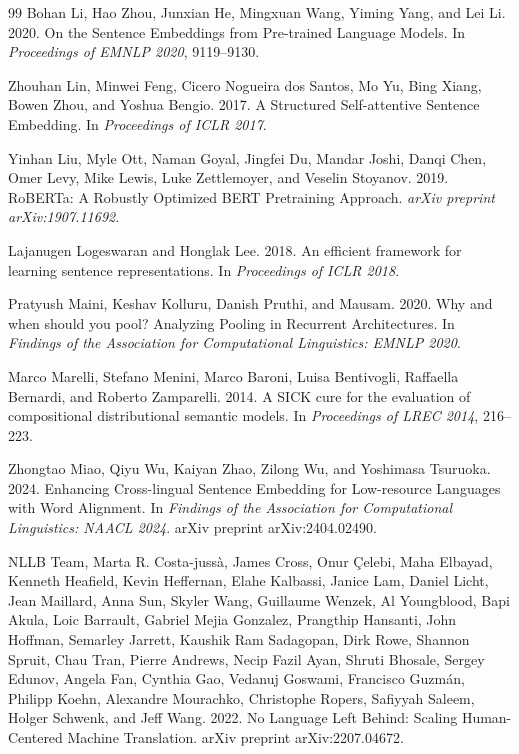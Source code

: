 \documentclass[manuscript]{acmart}
\begin{document}
\begin{thebibliography}{99}
Bohan Li, Hao Zhou, Junxian He, Mingxuan Wang, Yiming Yang, and Lei Li. 2020.
\newblock On the Sentence Embeddings from Pre-trained Language Models.
\newblock In \emph{Proceedings of EMNLP 2020}, 9119--9130.

Zhouhan Lin, Minwei Feng, Cicero Nogueira dos Santos, Mo Yu, Bing Xiang, Bowen Zhou, and Yoshua Bengio. 2017.
\newblock A Structured Self-attentive Sentence Embedding.
\newblock In \emph{Proceedings of ICLR 2017}.

Yinhan Liu, Myle Ott, Naman Goyal, Jingfei Du, Mandar Joshi, Danqi Chen, Omer Levy, Mike Lewis, Luke Zettlemoyer, and Veselin Stoyanov. 2019.
\newblock RoBERTa: A Robustly Optimized BERT Pretraining Approach.
\newblock \emph{arXiv preprint arXiv:1907.11692}.

Lajanugen Logeswaran and Honglak Lee. 2018.
\newblock An efficient framework for learning sentence representations.
\newblock In \emph{Proceedings of ICLR 2018}.

Pratyush Maini, Keshav Kolluru, Danish Pruthi, and Mausam. 2020.
\newblock Why and when should you pool? Analyzing Pooling in Recurrent Architectures.
\newblock In \emph{Findings of the Association for Computational Linguistics: EMNLP 2020}.

Marco Marelli, Stefano Menini, Marco Baroni, Luisa Bentivogli, Raffaella Bernardi, and Roberto Zamparelli. 2014.
\newblock A SICK cure for the evaluation of compositional distributional semantic models.
\newblock In \emph{Proceedings of LREC 2014}, 216--223.

Zhongtao Miao, Qiyu Wu, Kaiyan Zhao, Zilong Wu, and Yoshimasa Tsuruoka. 2024.
\newblock Enhancing Cross-lingual Sentence Embedding for Low-resource Languages with Word Alignment.
\newblock In \emph{Findings of the Association for Computational Linguistics: NAACL 2024}. arXiv preprint arXiv:2404.02490.

NLLB Team, Marta R. Costa-jussà, James Cross, Onur Çelebi, Maha Elbayad, Kenneth Heafield, Kevin Heffernan, Elahe Kalbassi, Janice Lam, Daniel Licht, Jean Maillard, Anna Sun, Skyler Wang, Guillaume Wenzek, Al Youngblood, Bapi Akula, Loic Barrault, Gabriel Mejia Gonzalez, Prangthip Hansanti, John Hoffman, Semarley Jarrett, Kaushik Ram Sadagopan, Dirk Rowe, Shannon Spruit, Chau Tran, Pierre Andrews, Necip Fazil Ayan, Shruti Bhosale, Sergey Edunov, Angela Fan, Cynthia Gao, Vedanuj Goswami, Francisco Guzmán, Philipp Koehn, Alexandre Mourachko, Christophe Ropers, Safiyyah Saleem, Holger Schwenk, and Jeff Wang. 2022.
\newblock No Language Left Behind: Scaling Human-Centered Machine Translation.
\newblock arXiv preprint arXiv:2207.04672.


\end{thebibliography}
\end{document}
